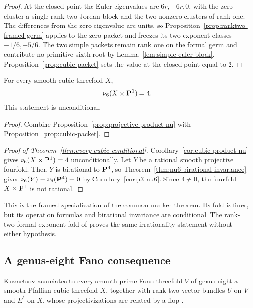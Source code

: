 \begin{proof}
At the closed point the Euler eigenvalues are $6r,-6r,0$, with the zero
cluster a single rank-two Jordan block and the two nonzero clusters of rank
one.  The differences from the zero eigenvalue are units, so
Proposition~\ref{prop:ranktwo-framed-germ} applies to the zero packet and
freezes its two exponent classes $-1/6,-5/6$.  The two simple packets remain
rank one on the formal germ and contribute no primitive sixth root by
Lemma~\ref{lem:simple-euler-block}.  Proposition~\ref{prop:cubic-packet}
sets the value at the closed point equal to $2$.
\end{proof}

\begin{corollary}
\label{cor:cubic-product-nu}
%
%
For every smooth cubic threefold $X$,
\[
 \nu_6(X\times\mathbf P^1)=4.
\]
This statement is unconditional.
\end{corollary}

\begin{proof}
Combine Proposition~\ref{prop:projective-product-nu} with
Proposition~\ref{prop:cubic-packet}.
\end{proof}

\begin{proof}[Proof of Theorem~\ref{thm:every-cubic-conditional}]
Corollary~\ref{cor:cubic-product-nu} gives \(\nu_6(X\times\mathbf P^1)=4\)
unconditionally.  Let \(Y\) be a rational smooth projective fourfold.  Then
\(Y\) is birational to \(\mathbf P^4\), so
Theorem~\ref{thm:nu6-birational-invariance} gives
\(\nu_6(Y)=\nu_6(\mathbf P^4)=0\) by Corollary~\ref{cor:p3-nu6}.
Since \(4\ne0\), the fourfold \(X\times\mathbf P^1\) is not rational.
\end{proof}

This is the framed specialization of the common marker theorem.  Its fold is
finer, but its operation formulas and birational invariance are conditional.
The rank-two formal-exponent fold of \cite{RuddM1} proves the same
irrationality statement without either hypothesis.

\subsection{A genus-eight Fano consequence}

Kuznetsov associates to every smooth prime Fano threefold \(V\) of genus
eight a smooth Pfaffian cubic threefold \(X\), together with rank-two vector
bundles \(U\) on \(V\) and \(E^*\) on \(X\), whose projectivizations are
related by a flop \cite[Theorems~2.17--2.18]{KuznetsovV14}.

